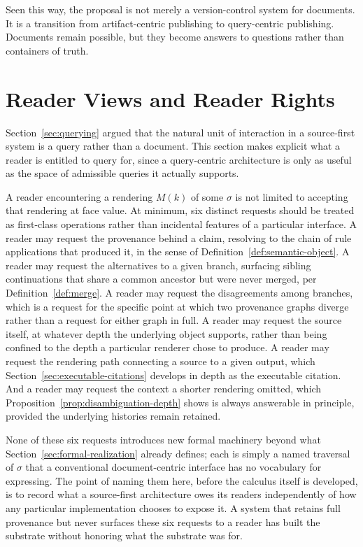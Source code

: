 \documentclass[11pt]{article}
\theoremstyle{definition}
\begin{document}
Seen this way, the proposal is not merely a version-control system for documents. It is a transition from artifact-centric publishing to query-centric publishing. Documents remain possible, but they become answers to questions rather than containers of truth.

\section{Reader Views and Reader Rights}
\label{sec:reader-rights}

Section~\ref{sec:querying} argued that the natural unit of interaction in a source-first system is a query rather than a document. This section makes explicit what a reader is entitled to query for, since a query-centric architecture is only as useful as the space of admissible queries it actually supports.

A reader encountering a rendering $M(k)$ of some $\sigma$ is not limited to accepting that rendering at face value. At minimum, six distinct requests should be treated as first-class operations rather than incidental features of a particular interface. A reader may request the provenance behind a claim, resolving to the chain of rule applications that produced it, in the sense of Definition~\ref{def:semantic-object}. A reader may request the alternatives to a given branch, surfacing sibling continuations that share a common ancestor but were never merged, per Definition~\ref{def:merge}. A reader may request the disagreements among branches, which is a request for the specific point at which two provenance graphs diverge rather than a request for either graph in full. A reader may request the source itself, at whatever depth the underlying object supports, rather than being confined to the depth a particular renderer chose to produce. A reader may request the rendering path connecting a source to a given output, which Section~\ref{sec:executable-citations} develops in depth as the executable citation. And a reader may request the context a shorter rendering omitted, which Proposition~\ref{prop:disambiguation-depth} shows is always answerable in principle, provided the underlying histories remain retained.

None of these six requests introduces new formal machinery beyond what Section~\ref{sec:formal-realization} already defines; each is simply a named traversal of $\sigma$ that a conventional document-centric interface has no vocabulary for expressing. The point of naming them here, before the calculus itself is developed, is to record what a source-first architecture owes its readers independently of how any particular implementation chooses to expose it. A system that retains full provenance but never surfaces these six requests to a reader has built the substrate without honoring what the substrate was for.
\end{document}
